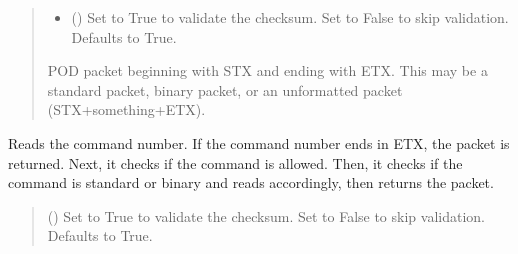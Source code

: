 \documentclass[letterpaper,10pt,english]{sphinxmanual}
\begin{document}
\begin{fulllineitems}
\begin{fulllineitems}
\begin{quote}
\begin{description}
\begin{itemize}
\item {} 
\sphinxAtStartPar
{} (\sphinxstyleliteralemphasis{\sphinxupquote{, }}) \textendash{} Set to True to validate the checksum. Set to False to skip                     validation. Defaults to True.

\end{itemize}

\sphinxAtStartPar
POD packet beginning with STX and ending with ETX. This may                 be a standard packet, binary packet, or an unformatted packet (STX+something+ETX).

\sphinxAtStartPar
{\hyperref[\detokenize{Morelia.Packets:Morelia.Packets.Packet.Packet}]{}}

\end{description}\end{quote}

\end{fulllineitems}


\begin{fulllineitems}
\label{\detokenize{Morelia.Devices:Morelia.Devices.BasicPodProtocol.Pod._ReadPODpacket_Recursive}}
\pysigstartsignatures
{}
\pysigstopsignatures
\sphinxAtStartPar
Reads the command number. If the command number ends in ETX, the packet is returned.         Next, it checks if the command is allowed. Then, it checks if the command is standard or         binary and reads accordingly, then returns the packet.
\begin{quote}\begin{description}
\sphinxAtStartPar
{} (\sphinxstyleliteralemphasis{\sphinxupquote{, }}) \textendash{} Set to True to validate the checksum. Set to False to                 skip validation. Defaults to True.


\end{description}
\end{quote}
\end{fulllineitems}
\end{fulllineitems}
\end{document}
